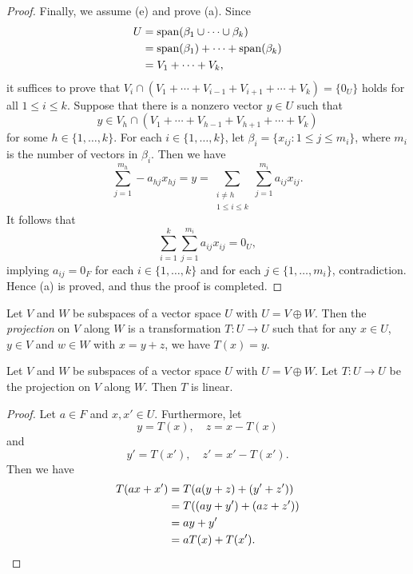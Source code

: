 \begin{proof}
  Finally, we assume (e) and prove (a).
  Since
  \begin{align*}
    U
    &= \operatorname{span}(\beta_1 \cup \cdots \cup \beta_k) \\
    &= \operatorname{span}(\beta_1) + \cdots + \operatorname{span}(\beta_k) \\
    &= V_1 + \cdots + V_k,
  \end{align*}
  it suffices to prove that
  $V_i \cap (V_1 + \cdots + V_{i-1} + V_{i+1} + \cdots + V_k) = \{0_U\}$
  holds for all $1 \leq i \leq k$.
  Suppose that there is a nonzero vector $y \in U$ such that
  \begin{equation*}
    y \in V_h \cap (V_1 + \cdots + V_{h-1} + V_{h+1} + \cdots + V_k)
  \end{equation*}
  for some $h \in \{1, \dots, k\}$.
  For each $i \in \{1, \dots, k\}$, let
  $\beta_i = \{x_{ij}: 1 \leq j \leq m_i\}$, where $m_i$ is the number of
  vectors in $\beta_i$.
  Then we have
  \begin{equation*}
    \sum_{j=1}^{m_h} -a_{hj}x_{hj}
    = y
    = \sum_{\substack{i \neq h \\ 1 \leq i \leq k}}
      \sum_{j=1}^{m_i} a_{ij}x_{ij}.
  \end{equation*}
  It follows that
  \begin{equation*}
    \sum_{i=1}^k \sum_{j=1}^{m_i} a_{ij}x_{ij} = 0_U,
  \end{equation*}
  implying $a_{ij} = 0_F$ for each $i \in \{1, \dots, k\}$ and for each
  $j \in \{1, \dots, m_i\}$, contradiction.
  Hence (a) is proved, and thus the proof is completed.
\end{proof}

\begin{definition}
  \label{def:projection}
  Let $V$ and $W$ be subspaces of a vector space $U$ with $U = V \oplus W$.
  Then the \emph{projection} on $V$ along $W$ is a transformation $T: U \to U$
  such that for any $x \in U$, $y \in V$ and $w \in W$ with $x = y + z$,
  we have $T(x) = y$.
\end{definition}

\begin{theorem}
  Let $V$ and $W$ be subspaces of a vector space $U$ with $U = V \oplus W$.
  Let $T: U \to U$ be the projection on $V$ along $W$.
  Then $T$ is linear.
\end{theorem}
\begin{proof}
  Let $a \in F$ and $x, x' \in U$.
  Furthermore, let
  \begin{equation*}
    y = T(x),
    \quad
    z = x - T(x)
  \end{equation*}
  and
  \begin{equation*}
    y' = T(x'),
    \quad
    z' = x' - T(x').
  \end{equation*}
  Then we have
  \begin{align*}
    T(ax + x')
    &= T(a(y + z) + (y' + z')) \\
    &= T((ay + y') + (az + z')) \\
    &= ay + y' \\
    &= aT(x) + T(x').
    \qedhere
  \end{align*}
\end{proof}

